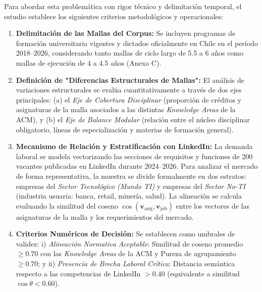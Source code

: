 Para abordar esta problemática con rigor técnico y delimitación temporal, el estudio establece los siguientes criterios metodológicos y operacionales:
\begin{enumerate}[label=\arabic*.]
	\item \textbf{Delimitación de las Mallas del Corpus:} Se incluyen programas de formación universitaria vigentes y dictados oficialmente en Chile en el período 2018–2026, considerando tanto mallas de ciclo largo de 5.5 a 6 años como mallas de ejecución de 4 a 4.5 años (Anexo C).
	\item \textbf{Definición de "Diferencias Estructurales de Mallas":} El análisis de variaciones estructurales se evalúa cuantitativamente a través de dos ejes principales: (a) el \textit{Eje de Cobertura Disciplinar} (proporción de créditos y asignaturas de la malla asociados a las distintas \textit{Knowledge Areas} de la ACM), y (b) el \textit{Eje de Balance Modular} (relación entre el núcleo disciplinar obligatorio, líneas de especialización y materias de formación general).
	\item \textbf{Mecanismo de Relación y Estratificación con LinkedIn:} La demanda laboral se modela vectorizando las secciones de requisitos y funciones de 200 vacantes publicadas en LinkedIn durante 2024–2026. Para analizar el mercado de forma representativa, la muestra se divide formalmente en dos estratos: empresas del \textit{Sector Tecnológico (Mundo TI)} y empresas del \textit{Sector No-TI} (industria usuaria: banca, retail, minería, salud). La alineación se calcula evaluando la similitud del coseno $\cos(\mathbf{v}_{\text{asig}}, \mathbf{v}_{\text{job}})$ entre los vectores de las asignaturas de la malla y los requerimientos del mercado.
	\item \textbf{Criterios Numéricos de Decisión:} Se establecen como umbrales de validez: i) \textit{Alineación Normativa Aceptable}: Similitud de coseno promedio $\ge 0.70$ con las \textit{Knowledge Areas} de la ACM y Pureza de agrupamiento $\ge 0.70$; y ii) \textit{Presencia de Brecha Laboral Crítica}: Distancia semántica respecto a las competencias de LinkedIn $> 0.40$ (equivalente a similitud $\cos \theta < 0.60$).
\end{enumerate}